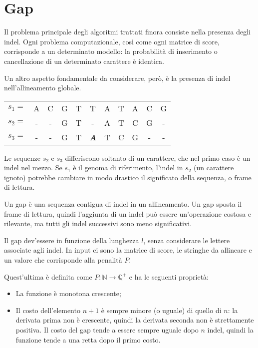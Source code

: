 \section{Gap}
Il problema principale degli algoritmi trattati finora consiste nella presenza degli indel. Ogni problema computazionale, così come ogni matrice di score, corrisponde a un determinato modello: la probabilità di inserimento o cancellazione di un determinato carattere è identica.

Un altro aspetto fondamentale da considerare, però, è la presenza di indel nell'allineamento globale.

\begin{example}{}{}
	\begin{tabular}{l *{10}{c}}
		$s_1 =$ & A & C & G & T & T & A & T & A & C & G \\
		$s_2 =$ & - & - & G & T & - & A & T & C & G & - \\
		$s_3 =$ & - & - & G & T & \textit{\textbf{A}} & T & C & G & - & -
	\end{tabular}

	Le sequenze $s_2$ e $s_3$ differiscono soltanto di un carattere, che nel primo caso è un indel nel mezzo. Se $s_1$ è il genoma di riferimento, l'indel in $s_2$ (un carattere ignoto) potrebbe cambiare in modo drastico il significato della sequenza, o frame di lettura.
\end{example}
Un gap è una sequenza contigua di indel in un allineamento. Un gap sposta il frame di lettura, quindi l'aggiunta di un indel può essere un'operazione costosa e rilevante, ma tutti gli indel successivi sono meno significativi. 

Il gap dev'essere in funzione della lunghezza $l$, senza considerare le lettere associate agli indel. In input ci sono la matrice di score, le stringhe da allineare e un valore che corrisponde alla penalità $P$. 

Quest'ultima è definita come $P : \mathbb{N} \rightarrow \mathbb{Q}^+$ e ha le seguenti proprietà:
\begin{itemize}
	\item La funzione è monotona crescente;
	\item Il costo dell'elemento $n+1$ è sempre minore (o uguale) di quello di $n$: la derivata prima non è crescente, quindi la derivata seconda non è strettamente positiva. Il costo del gap tende a essere sempre uguale dopo $n$ indel, quindi la funzione tende a una retta dopo il primo costo.
\end{itemize}

